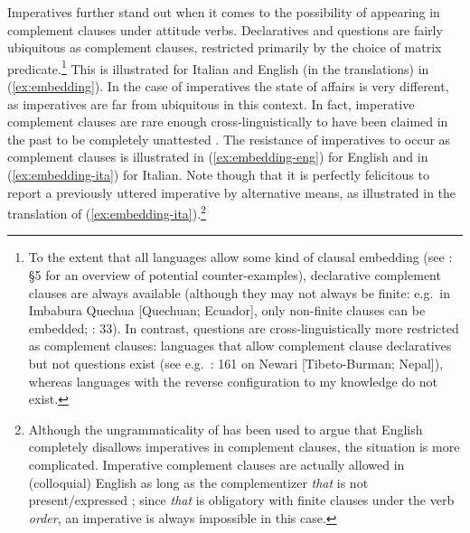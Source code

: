 \documentclass[output=paper,colorlinks,citecolor=brown]{langscibook}
\begin{document}
Imperatives further stand out when it comes to the possibility of appearing in complement clauses under attitude verbs. Declaratives and questions are fairly ubiquitous as complement clauses, restricted primarily by the choice of matrix predicate.\footnote{To the extent that all languages allow some kind of clausal embedding (see \cite{pullumscholz10}: \S5 for an overview of potential counter-examples), declarative complement clauses are always available (although they may not always be finite: e.g.\ in Imbabura Quechua [Quechuan; Ecuador], only non-finite clauses can be embedded; \cite{cole82}: 33). In contrast, questions are cross-linguistically more restricted as complement clauses: languages that allow complement clause declaratives but not questions exist (see e.g.\ \cite{zu18}: 161 on Newari [Tibeto-Burman; Nepal]), whereas languages with the reverse configuration to my knowledge do not exist.} This is illustrated for Italian and English (in the translations) in (\ref{ex:embedding}).
\ea \label{ex:embedding}
\z\z
In the case of imperatives the state of affairs is very different, as imperatives are far from ubiquitous in this context. In fact, imperative complement clauses are rare enough cross-linguistically to have been claimed in the past to be completely unattested \parencite[see e.g.][]{Sadock.Zwicky1985,han98,han00}. The resistance of imperatives to occur as complement clauses is illustrated in (\ref{ex:embedding-eng}) for English and in (\ref{ex:embedding-ita}) for Italian. Note though that it is perfectly felicitous to report a previously uttered imperative by alternative means, as illustrated in the translation of (\ref{ex:embedding-ita}).\footnote{Although the ungrammaticality of  has been used to argue that English completely disallows imperatives in complement clauses, the situation is more complicated. Imperative complement clauses are actually allowed in (colloquial) English as long as the complementizer \textit{that} is not present/expressed \parencite{crnic-trinhSUB,crnic-trinhNELS}; since \textit{that} is obligatory with finite clauses under the verb \emph{order}, an imperative is always impossible in this case.}
\end{document}
